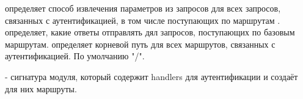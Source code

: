 \begin{ocamlindent}
\begin{ocamlindent}
 определяет способ извлечения параметров из запросов для всех запросов, связанных с аутентификацией, в том числе поступающих по маршрутам \hyperref[page-FPauth-core-module-FPauth+u+core-module-Auth+u+sign-module-type-STRATEGY-val-routes]{}. определяет, какие ответы отправлять дял запросов, поступающих по базовым маршрутам. определяет корневой путь для всех маршрутов, связанных с аутентификацией. По умолчанию "/".\end{ocamlindent}%
\medbreak
\end{ocamlindent}%
\begin{ocamlindent} - сигнатура модуля, который содержит handlers для аутентификации и создаёт для них маршруты.\end{ocamlindent}%
\medbreak



